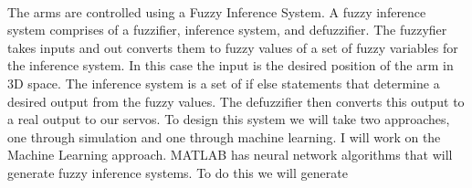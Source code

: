 \documentclass{article}
\begin{document}
\paragraph{} The arms are controlled using a Fuzzy Inference System. A fuzzy
inference system comprises of a fuzzifier, inference system, and defuzzifier.
The fuzzyfier takes inputs and out converts them to fuzzy values of a set of
fuzzy variables for the inference system. In this case the input is the desired
position of the arm in 3D space. The inference system is a set of if else
statements that determine a desired output from the fuzzy values. The
defuzzifier then converts this output to a real output to our
servos\cite{fuzzy2011}. To design this system we will take two approaches, one
through simulation and one through machine learning. I will work on the Machine
Learning approach. MATLAB has neural network algorithms that will generate fuzzy
inference systems. To do this we will generate

\printbibliography
\end{document}
